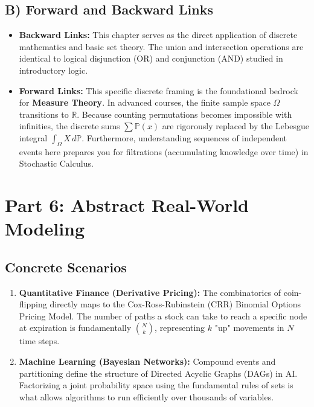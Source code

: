 \documentclass[11pt, letterpaper]{article}
\theoremstyle{definition}
\theoremstyle{remark}
\newcommand{\R}{\mathbb{R}}
\newcommand{\Prob}{\mathbb{P}}
\begin{document}
\subsection{B) Forward and Backward Links}
\begin{itemize}
    \item \textbf{Backward Links:} This chapter serves as the direct application of discrete mathematics and basic set theory. The union and intersection operations are identical to logical disjunction (OR) and conjunction (AND) studied in introductory logic.
    \item \textbf{Forward Links:} This specific discrete framing is the foundational bedrock for \textbf{Measure Theory}. In advanced courses, the finite sample space $\Omega$ transitions to $\R$. Because counting permutations becomes impossible with infinities, the discrete sums $\sum \Prob(x)$ are rigorously replaced by the Lebesgue integral $\int_\Omega X \, d\Prob$. Furthermore, understanding sequences of independent events here prepares you for filtrations (accumulating knowledge over time) in Stochastic Calculus.
\end{itemize}

\section{Part 6: Abstract Real-World Modeling}

\subsection{Concrete Scenarios}
\begin{enumerate}
    \item \textbf{Quantitative Finance (Derivative Pricing):} The combinatorics of coin-flipping directly maps to the Cox-Ross-Rubinstein (CRR) Binomial Options Pricing Model. The number of paths a stock can take to reach a specific node at expiration is fundamentally $\binom{N}{k}$, representing $k$ "up" movements in $N$ time steps.
    \item \textbf{Machine Learning (Bayesian Networks):} Compound events and partitioning define the structure of Directed Acyclic Graphs (DAGs) in AI. Factorizing a joint probability space using the fundamental rules of sets is what allows algorithms to run efficiently over thousands of variables.
\end{enumerate}
\end{document}

